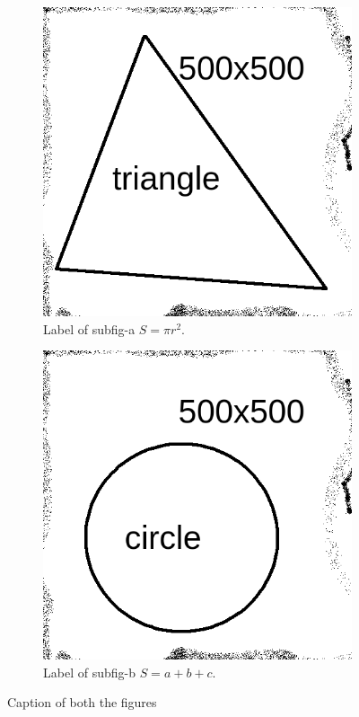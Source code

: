 \documentclass[
	11pt
] {article}
\begin{document}
		\begin{figure}[H]
			\centering
			\begin{subfigure}[b]{0.49\textwidth}
				\centering
				\includegraphics[width=\textwidth]{fig-default-01}
				\caption{Label of subfig-a $S = \pi r^2$.}
				\label{subfig:default-a}
			\end{subfigure}
			\hfill
			\begin{subfigure}[b]{0.49\textwidth}
				\centering
				\includegraphics[width=\textwidth]{fig-default-02}
				\caption{Label of subfig-b $S = a + b + c$.}
				\label{subfig:default-b}
			\end{subfigure}
			\caption{Caption of both the figures}
			\label{fig:default-label-figure-two-shapes}
		\end{figure}
\end{document}
